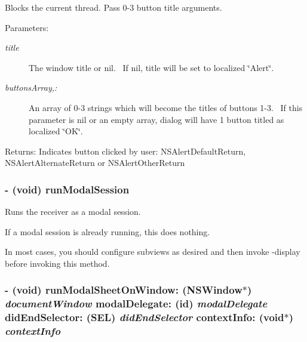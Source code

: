 Blocks the current thread. Pass 0-3 button title arguments. \begin{Desc}
\item[Parameters:]
\begin{description}
\item[{\em title}]The window title or nil.~ If nil, title will be set to localized \char`\"{}Alert\char`\"{}. \item[{\em buttonsArray,:}]An array of 0-3 strings which will become the titles of buttons 1-3.~ If this parameter is nil or an empty array, dialog will have 1 button titled as localized \char`\"{}OK\char`\"{}. \end{description}
\end{Desc}
\begin{Desc}
\item[Returns:]Indicates button clicked by user: NSAlertDefaultReturn, NSAlertAlternateReturn or NSAlertOtherReturn \end{Desc}
\hypertarget{interface_s_s_y_alert_635093dd5f073df822990abb2e00f45c}{
\subsubsection[{runModalSession}]{\setlength{\rightskip}{0pt plus 5cm}- (void) runModalSession }}
\label{interface_s_s_y_alert_635093dd5f073df822990abb2e00f45c}


Runs the receiver as a modal session. 

If a modal session is already running, this does nothing.

In most cases, you should configure subviews as desired and then invoke -display before invoking this method. \hypertarget{interface_s_s_y_alert_1802c30942f4a728c4c5806ef7d0d9e5}{
\subsubsection[{runModalSheetOnWindow:modalDelegate:didEndSelector:contextInfo:}]{\setlength{\rightskip}{0pt plus 5cm}- (void) runModalSheetOnWindow: (NSWindow$\ast$) {\em documentWindow}\/ modalDelegate: (id) {\em modalDelegate}\/ didEndSelector: (SEL) {\em didEndSelector}\/ contextInfo: (void$\ast$) {\em contextInfo}}}
\label{interface_s_s_y_alert_1802c30942f4a728c4c5806ef7d0d9e5}


